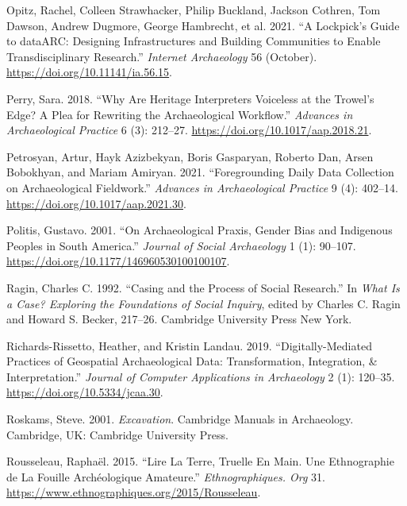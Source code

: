 \documentclass[
]{article}
\newlength{\cslhangindent}
\newenvironment{CSLReferences}[2] %
 {\begin{list}{}{%
  \setlength{\itemindent}{0pt}
  \setlength{\leftmargin}{0pt}
  \setlength{\parsep}{0pt}
  \ifodd #1
   \setlength{\leftmargin}{\cslhangindent}
   \setlength{\itemindent}{-1\cslhangindent}
  \fi
  \setlength{\itemsep}{#2\baselineskip}}}
 {\end{list}}
\begin{document}
\begin{CSLReferences}{1}{0}
Opitz, Rachel, Colleen Strawhacker, Philip Buckland, Jackson Cothren,
Tom Dawson, Andrew Dugmore, George Hambrecht, et al. 2021. {``A
{Lockpick}'s {Guide} to {dataARC}: {Designing Infrastructures} and
{Building Communities} to {Enable Transdisciplinary Research}.''}
\emph{Internet Archaeology} 56 (October).
\url{https://doi.org/10.11141/ia.56.15}.

Perry, Sara. 2018. {``Why {Are Heritage Interpreters Voiceless} at the
{Trowel}'s {Edge}? {A Plea} for {Rewriting} the {Archaeological
Workflow}.''} \emph{Advances in Archaeological Practice} 6 (3): 212--27.
\url{https://doi.org/10.1017/aap.2018.21}.

Petrosyan, Artur, Hayk Azizbekyan, Boris Gasparyan, Roberto Dan, Arsen
Bobokhyan, and Mariam Amiryan. 2021. {``Foregrounding {Daily Data
Collection} on {Archaeological Fieldwork}.''} \emph{Advances in
Archaeological Practice} 9 (4): 402--14.
\url{https://doi.org/10.1017/aap.2021.30}.

Politis, Gustavo. 2001. {``On Archaeological Praxis, Gender Bias and
Indigenous Peoples in {South America}.''} \emph{Journal of Social
Archaeology} 1 (1): 90--107.
\url{https://doi.org/10.1177/146960530100100107}.

Ragin, Charles C. 1992. {``Casing and the Process of Social Research.''}
In \emph{What Is a {Case}? {Exploring} the {Foundations} of {Social
Inquiry}}, edited by Charles C. Ragin and Howard S. Becker, 217--26.
Cambridge University Press New York.

Richards-Rissetto, Heather, and Kristin Landau. 2019.
{``Digitally-{Mediated Practices} of {Geospatial Archaeological Data}:
{Transformation}, {Integration}, \& {Interpretation}.''} \emph{Journal
of Computer Applications in Archaeology} 2 (1): 120--35.
\url{https://doi.org/10.5334/jcaa.30}.

Roskams, Steve. 2001. \emph{Excavation}. Cambridge Manuals in
Archaeology. Cambridge, UK: Cambridge University Press.

Rousseleau, Raphaël. 2015. {``Lire La Terre, Truelle En Main. {Une}
Ethnographie de La Fouille Archéologique Amateure.''}
\emph{Ethnographiques. Org} 31.
\url{https://www.ethnographiques.org/2015/Rousseleau}.


\end{CSLReferences}
\end{document}
